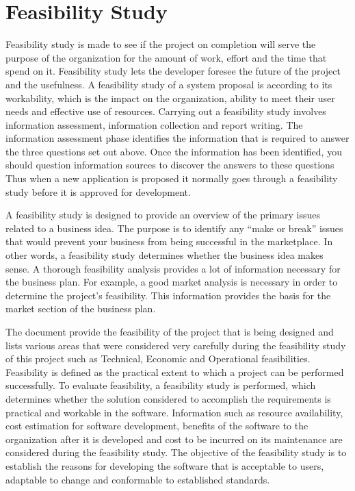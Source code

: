 \section{Feasibility Study}
Feasibility study is made to see if the project on completion will serve the purpose of the organization for the amount of work, effort and the time that spend on it. Feasibility study lets the developer foresee the future of the project and the usefulness. A feasibility study of a system proposal is according to its workability, which is the impact on the organization, ability to meet their user needs and effective use of resources. Carrying out a feasibility study involves information assessment, information collection and report writing. The information assessment phase identifies the information that is required to answer the three questions set out above. Once the information has been identified, you should question information sources to discover the answers to these questions Thus when a new application is proposed it normally goes through a feasibility study before it is approved for development.

A feasibility study is designed to provide an overview of the primary issues related to a business idea.  The purpose is to identify any “make or break” issues that would prevent your business from being successful in the marketplace. In other words, a feasibility study determines whether the business idea makes sense. A thorough feasibility analysis provides a lot of information necessary for the business plan.  For example, a good market analysis is necessary in order to determine the project’s feasibility.  This information provides the basis for the market section of the business plan.

The document provide the feasibility of the project that is being designed and lists various areas that were considered very carefully during the feasibility study of this project such as Technical, Economic and Operational feasibilities. Feasibility is defined as the practical extent to which a project can be performed successfully. To evaluate feasibility, a feasibility study is performed, which determines whether the solution considered to accomplish the requirements is practical and workable in the software. Information such as resource availability, cost estimation for software development, benefits of the software to the organization after it is developed and cost to be incurred on its maintenance are considered during the feasibility study. The objective of the feasibility study is to establish the reasons for developing the software that is acceptable to users, adaptable to change and conformable to established standards.

